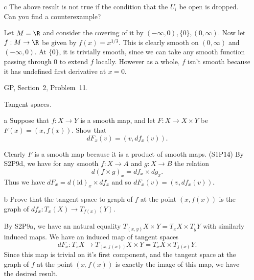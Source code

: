 \documentclass[11pt,letterpaper]{article}
\def\id{\mathrm{id}}
\begin{document}
\begin{solution}
    \begin{partproblem}{c}
        The above result is not true if the condition that the $U_i$ be open is dropped. Can you find a counterexample? %
    \end{partproblem}

    \begin{solution}
        \quad Let $M=\R$ and consider the covering of it by $(-\infty,0), \{0\}, (0,\infty)$. Now let $f : M \to \R$ be given by $f(x)=x^{1 /3}$. This is clearly smooth on $(0,\infty)$ and $(-\infty,0)$. At $\{0\}$, it is trivially smooth, since we can take any smooth function passing through $0$ to extend $f$ locally. However as a whole, $f$ isn't smooth because it has undefined first derivative at $x=0$. 
    \end{solution}
\end{solution}

\begin{problem}
    GP, Section~2, Problem~11.
\end{problem}

\begin{solution}
    Tangent spaces.
    \begin{partproblem}{a}
        Suppose that $f : X \to Y$ is a smooth map, and let $F : X \to X\times Y$ be $F(x)=(x, f(x))$. Show that
        \[
            dF_x(v) = (v, df_x(v))
        .\] 
    \end{partproblem}

    \begin{solution}
        \quad Clearly $F$ is a smooth map because it is a product of smooth maps. (S1P14) By S2P9d, we have for any smooth $f : X\to A$ and $g : X\to B$ the relation
        \[
            d(f\times g)_x = df_x\times dg_x
        .\] 
        Thus we have $dF_x = d(\id)_x\times df_x$ and so $dF_x(v)=(v,df_x(v))$. 
    \end{solution}

    \begin{partproblem}{b}
        Prove that the tangent space to graph of $f$ at the point $(x,f(x))$ is the graph of $df_x : T_x(X) \to T_{f(x)}(Y)$.
    \end{partproblem}

    \begin{solution}
        \quad By S2P9a, we have an natural equality $T_{(x,y)}X\times Y = T_xX\times T_yY$ with similarly induced maps. We have an induced map of tangent spaces
        \[
            dF_x : T_xX \to T_{(x,f(x))}X\times Y = T_xX \times T_{f(x)}Y
        .\]
        Since this map is trivial on it's first component, and the tangent space at the graph of $f$ at the point $(x,f(x))$ is exactly the image of this map, we have the desired result.
    \end{solution}
\end{solution}
\end{document}
